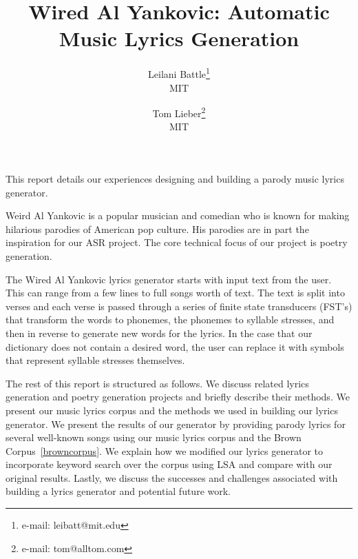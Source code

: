 \documentclass{vgtc}                          %
\title{Wired Al Yankovic: Automatic Music Lyrics Generation}
\author{Leilani Battle\thanks{e-mail: leibatt@mit.edu}\\ %
        \scriptsize MIT %
\and Tom Lieber\thanks{e-mail: tom@alltom.com}\\ %
     \scriptsize MIT}
\begin{document}


\maketitle

\label{sec:intro}
This report details our experiences designing and building a parody music lyrics generator.

Weird Al Yankovic is a popular musician and comedian who is known for making
hilarious parodies of American pop culture. His parodies are in part the inspiration for our ASR
project. The core technical focus of our project is poetry generation.

The Wired Al Yankovic lyrics generator starts with input text from the user. This
can range from a few lines to full songs worth of text. The text is split into verses and each verse is passed
through a series of finite state transducers (FST's) that transform the words to phonemes, the phonemes to syllable stresses, and then
in reverse to generate new words for the lyrics. In the case that our dictionary does not contain a desired word, the user can replace it with symbols that represent syllable stresses themselves.

The rest of this report is structured as follows. We discuss related lyrics generation
and poetry generation projects and briefly describe their methods. We present
our music lyrics corpus and the methods we used in building our lyrics generator.
We present the results of our generator by providing parody lyrics for
several well-known songs using our music lyrics corpus
and the Brown Corpus~\ref{browncorpus}. We explain how we modified our lyrics generator
to incorporate keyword search over the corpus using LSA and compare with our original
results. Lastly, we discuss the successes
and challenges associated with building a lyrics generator and potential
future work.
\end{document}
